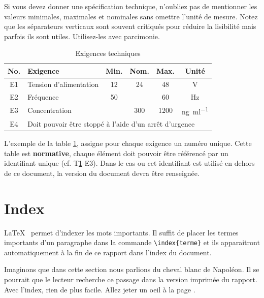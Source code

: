 \documentclass[
    iai, %
    eai, %
]{heig-tb}
\begin{document}
Si vous devez donner une spécification technique, n'oubliez pas de mentionner les valeurs minimales, maximales et nominales sans omettre l'unité de mesure. Notez que les séparateurs verticaux sont souvent critiqués pour réduire la lisibilité mais parfois ils sont utiles. Utilisez-les avec parcimonie.

\begin{table}[h]
  \begin{center}
    \caption{Exigences techniques \label{specification}}
    \begin{tabularx}{\textwidth}{cXcccc}
      No. & Exigence                                                                   & Min. & Nom. & Max. & Unité                           \\ \toprule
      E1  & Tension d'alimentation                                                     & 12   & 24   & 48   & \si{\volt}                      \\ \midrule
      E2  & Fréquence                                                                  & 50   &      & 60   & \si{\hertz}                     \\ \midrule
      E3  & Concentration                                                              &      & 300  & 1200 & \si{\nano\gram\per\milli\litre} \\ \midrule
      E4  & \multicolumn{5}{l}{Doit pouvoir être stoppé à l'aide d'un arrêt d'urgence}
    \end{tabularx}
  \end{center}
\end{table}

L'exemple de la table \ref{specification}, assigne pour chaque exigence un numéro unique. Cette table est \textbf{normative}, chaque élément doit pouvoir être référencé par un identifiant unique (cf. T\ref{specification}-E3). Dans le cas ou cet identifiant est utilisé en dehors de ce document, la version du document devra être renseignée.

\section{Index}
\LaTeX~ permet d'indexer les mots  importants. Il suffit de placer les termes importants d'un paragraphe dans la commande \texttt{\textbackslash index\{terme\}} et ils apparaitront automatiquement à la fin de ce rapport dans l'index du document.


Imaginons que dans cette section nous parlions du cheval blanc  de Napoléon. Il se pourrait que le lecteur recherche ce passage dans la version imprimée du rapport. Avec l'index, rien de plus facile. Allez jeter un oeil à la page \pageref{index}.
\end{document}
